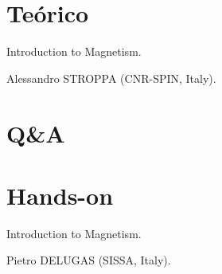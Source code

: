 \section{Teórico}

   Introduction to Magnetism.

  	Alessandro STROPPA (CNR-SPIN, Italy).

\section{Q\&A}

\section{Hands-on}

   Introduction to Magnetism.

  	Pietro DELUGAS (SISSA, Italy).
